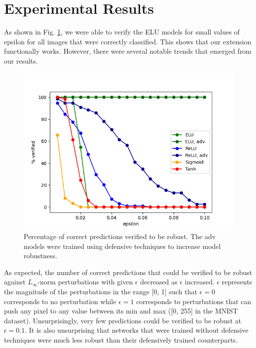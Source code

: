 \documentclass{llncs}
\begin{document}
\section{Experimental Results}



As shown in Fig. \ref{fig:verified_pct}, we were able to verify the ELU models for small values of epsilon for all images that were correctly classified. This shows that our extension functionally works.
However, there were several notable trends that emerged from our results.

\begin{figure}[h]
    \centering
    \includegraphics[width=\linewidth]{verified_pct_plot.png}
    \caption{Percentage of correct predictions verified to be robust. The adv models were trained using defensive techniques to increase model robustness.}
    \label{fig:verified_pct}
\end{figure}

As expected, the number of correct predictions that could be verified to be robust against $L_\infty$-norm perturbations with given $\epsilon$ decreased as $\epsilon$ increased.
$\epsilon$ represents the magnitude of the perturbations in the range [0, 1] such that
$\epsilon = 0$ corresponds to no perturbation while $\epsilon = 1$ corresponds to perturbations that can push any pixel to any value between its min and max ([0, 255] in the MNIST dataset).
Unsurprisingly, very few predictions could be verified to be robust at $\epsilon = 0.1$.
It is also unsurprising that networks that were trained without defensive techniques were much less robust than their defensively trained counterparts.
\end{document}
